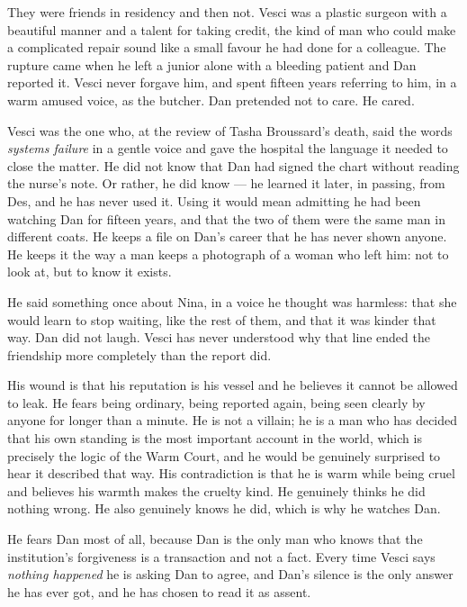 \documentclass{design/chronicle}
\begin{document}
{
They were friends in residency and then not. Vesci was a plastic surgeon with a beautiful manner and a talent for taking credit, the kind of man who could make a complicated repair sound like a small favour he had done for a colleague. The rupture came when he left a junior alone with a bleeding patient and Dan reported it. Vesci never forgave him, and spent fifteen years referring to him, in a warm amused voice, as the butcher. Dan pretended not to care. He cared.

Vesci was the one who, at the review of Tasha Broussard’s death, said the words \emph{systems failure} in a gentle voice and gave the hospital the language it needed to close the matter. He did not know that Dan had signed the chart without reading the nurse’s note. Or rather, he did know — he learned it later, in passing, from Des, and he has never used it. Using it would mean admitting he had been watching Dan for fifteen years, and that the two of them were the same man in different coats. He keeps a file on Dan’s career that he has never shown anyone. He keeps it the way a man keeps a photograph of a woman who left him: not to look at, but to know it exists.

He said something once about Nina, in a voice he thought was harmless: that she would learn to stop waiting, like the rest of them, and that it was kinder that way. Dan did not laugh. Vesci has never understood why that line ended the friendship more completely than the report did.

His wound is that his reputation is his vessel and he believes it cannot be allowed to leak. He fears being ordinary, being reported again, being seen clearly by anyone for longer than a minute. He is not a villain; he is a man who has decided that his own standing is the most important account in the world, which is precisely the logic of the Warm Court, and he would be genuinely surprised to hear it described that way. His contradiction is that he is warm while being cruel and believes his warmth makes the cruelty kind. He genuinely thinks he did nothing wrong. He also genuinely knows he did, which is why he watches Dan.

He fears Dan most of all, because Dan is the only man who knows that the institution’s forgiveness is a transaction and not a fact. Every time Vesci says \emph{nothing happened} he is asking Dan to agree, and Dan’s silence is the only answer he has ever got, and he has chosen to read it as assent.

}
\end{document}
